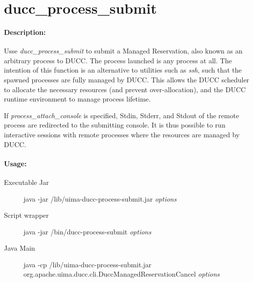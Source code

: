     \section{ducc\_process\_submit}

    \paragraph{Description:}
       Usse {\em ducc\_process\_submit} to submit a Managed Reservation, also known as an
       arbitrary process to DUCC.  The process launched is any process at all.  The intention
       of this function is an alternative to utilities such as {\em ssh}, such that the
       spawned processes are fully managed by DUCC.  This allows the DUCC scheduler to allocate
       the necessary resources (and prevent over-allocation), and the DUCC runtime environment
       to manage process lifetime.

       If {\em process\_attach\_console} is specified, Stdin, Stderr, and Stdout of the remote
       process are redirected to the submitting console.  It is thus possible to run interactive
       sessions with remote processes where the resources are managed by DUCC.

    \paragraph{Usage:}
    \begin{description}
    \item[Executable Jar] java -jar \ducchome/lib/uima-ducc-process-submit.jar {\em options}
    \item[Script wrapper] java -jar \ducchome/bin/ducc-process-submit {\em options}
    \item[Java Main]      java -cp \ducchome/lib/uima-ducc-process-submit.jar org.apache.uima.ducc.cli.DuccManagedReservationCancel {\em options}
    \end{description}

